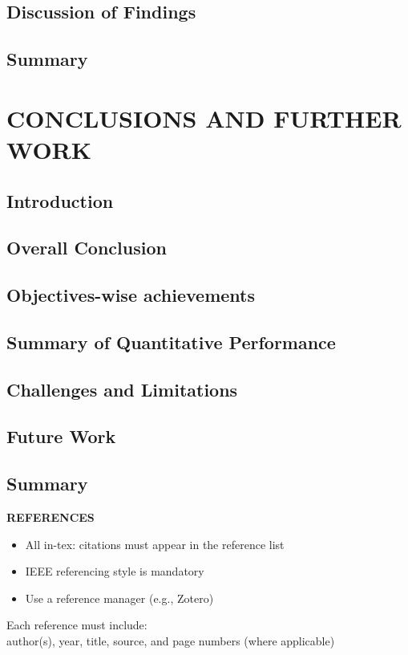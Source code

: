 \documentclass[12pt, a4paper]{report}
\begin{document}
\section{Discussion of Findings}
\section{Summary}

\chapter{CONCLUSIONS AND FURTHER WORK}
\section{Introduction}
\section{Overall Conclusion}
\section{Objectives-wise achievements}
\section{Summary of Quantitative Performance}
\section{Challenges and Limitations}
\section{Future Work}
\section{Summary}


\clearpage
{}
\begin{center}
    \textbf{REFERENCES}
\end{center}
\vspace{0.2in}
\begin{itemize}
    \item All in-tex: citations must appear in the reference list
    \item IEEE referencing style is mandatory
    \item Use a reference manager (e.g., Zotero)
\end{itemize}
Each reference must include:\\
author(s), year, title, source, and page numbers (where applicable)
\end{document}
